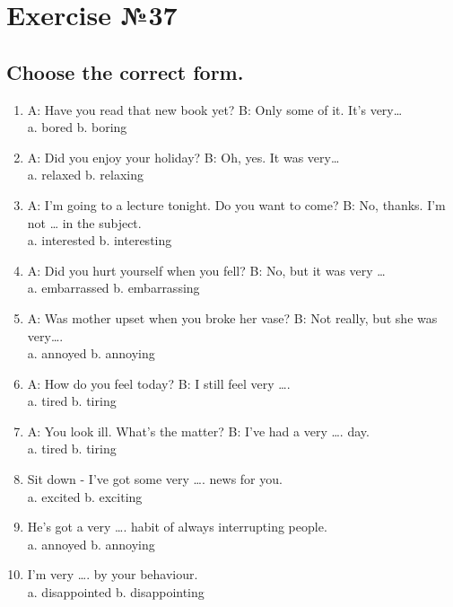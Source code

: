 \section*{Exercise №37}
\subsection*{Choose the correct form.}
\begin{enumerate}
      \item A: Have you read that new book yet? B: Only some of it. It’s very…\\
            a. bored \quad b. boring

      \item A: Did you enjoy your holiday? B: Oh, yes. It was very…\\
            a. relaxed \quad b. relaxing

      \item A: I'm going to a lecture tonight. Do you want to come? B: No, thanks. I'm not … in the subject.\\
            a. interested \quad b. interesting

      \item A: Did you hurt yourself when you fell? B: No, but it was very …\\
            a. embarrassed \quad b. embarrassing

      \item A: Was mother upset when you broke her vase? B: Not really, but she was very….\\
            a. annoyed \quad b. annoying

      \item A: How do you feel today? B: I still feel very ….\\
            a. tired \quad b. tiring

      \item A: You look ill. What’s the matter? B: I’ve had a very …. day.\\
            a. tired \quad b. tiring

      \item Sit down - I've got some very …. news for you.\\
            a. excited \quad b. exciting

      \item He's got a very …. habit of always interrupting people.\\
            a. annoyed \quad b. annoying

      \item I'm very …. by your behaviour.\\
            a. disappointed \quad b. disappointing
\end{enumerate}

